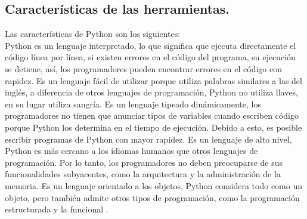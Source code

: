 \subsection{Características de las herramientas.}

Las características de Python son los siguientes: \\
Python es un lenguaje interpretado, lo que significa que ejecuta directamente el código línea por línea, si existen errores en el código del programa, su ejecución se detiene, así, los programadores pueden encontrar errores en el código con rapidez.
Es un lenguaje fácil de utilizar porque utiliza palabras similares a las del inglés, a diferencia de otros lenguajes de programación, Python no utiliza llaves, en su lugar utiliza sangría. 
Es un lenguaje tipeado dinámicamente, los programadores no tienen que anunciar tipos de variables cuando escriben código porque Python los determina en el tiempo de ejecución. Debido a esto, es posible escribir programas de Python con mayor rapidez.
Es un lenguaje de alto nivel, Python es más cercano a los idiomas humanos que otros lenguajes de programación. Por lo tanto, los programadores no deben preocuparse de sus funcionalidades subyacentes, como la arquitectura y la administración de la memoria.
Es un lenguaje orientado a los objetos, Python considera todo como un objeto, pero también admite otros tipos de programación, como la programación estructurada y la funcional \cite{Bl}. \\

